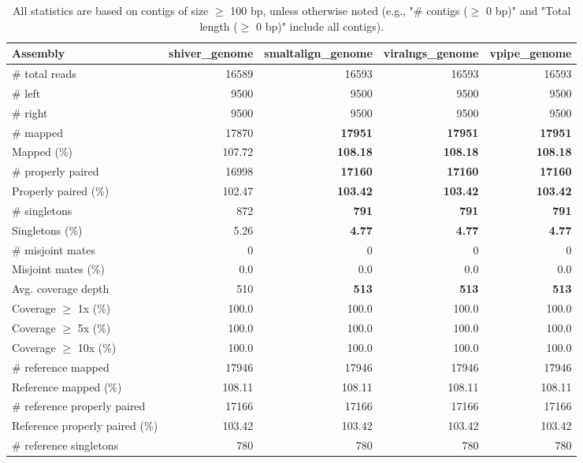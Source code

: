 \documentclass[12pt,a4paper]{article}
\begin{document}
\begin{table}[ht]
\begin{center}
\caption{All statistics are based on contigs of size $\geq$ 100 bp, unless otherwise noted (e.g., "\# contigs ($\geq$ 0 bp)" and "Total length ($\geq$ 0 bp)" include all contigs).}
\begin{tabular}{|l*{4}{|r}|}
\hline
Assembly & shiver\_genome & smaltalign\_genome & viralngs\_genome & vpipe\_genome \\ \hline
\# total reads & 16589 & 16593 & 16593 & 16593 \\ \hline
\# left & 9500 & 9500 & 9500 & 9500 \\ \hline
\# right & 9500 & 9500 & 9500 & 9500 \\ \hline
\# mapped & 17870 & {\bf 17951} & {\bf 17951} & {\bf 17951} \\ \hline
Mapped (\%) & 107.72 & {\bf 108.18} & {\bf 108.18} & {\bf 108.18} \\ \hline
\# properly paired & 16998 & {\bf 17160} & {\bf 17160} & {\bf 17160} \\ \hline
Properly paired (\%) & 102.47 & {\bf 103.42} & {\bf 103.42} & {\bf 103.42} \\ \hline
\# singletons & 872 & {\bf 791} & {\bf 791} & {\bf 791} \\ \hline
Singletons (\%) & 5.26 & {\bf 4.77} & {\bf 4.77} & {\bf 4.77} \\ \hline
\# misjoint mates & 0 & 0 & 0 & 0 \\ \hline
Misjoint mates (\%) & 0.0 & 0.0 & 0.0 & 0.0 \\ \hline
Avg. coverage depth & 510 & {\bf 513} & {\bf 513} & {\bf 513} \\ \hline
Coverage $\geq$ 1x (\%) & 100.0 & 100.0 & 100.0 & 100.0 \\ \hline
Coverage $\geq$ 5x (\%) & 100.0 & 100.0 & 100.0 & 100.0 \\ \hline
Coverage $\geq$ 10x (\%) & 100.0 & 100.0 & 100.0 & 100.0 \\ \hline
\# reference mapped & 17946 & 17946 & 17946 & 17946 \\ \hline
Reference mapped (\%) & 108.11 & 108.11 & 108.11 & 108.11 \\ \hline
\# reference properly paired & 17166 & 17166 & 17166 & 17166 \\ \hline
Reference properly paired (\%) & 103.42 & 103.42 & 103.42 & 103.42 \\ \hline
\# reference singletons & 780 & 780 & 780 & 780 \\ \hline

\end{tabular}
\end{center}
\end{table}
\end{document}

